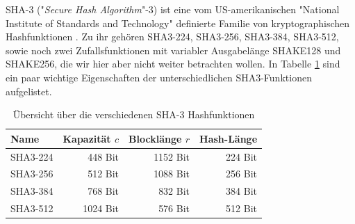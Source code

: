 SHA-3 ("\textit{Secure Hash Algorithm}"-3) ist eine vom US-amerikanischen "National Institute of Standards and Technology"
definierte Familie von kryptographischen Hashfunktionen \cite{sha3-standard}. Zu ihr gehören SHA3-224, SHA3-256, SHA3-384, SHA3-512,
sowie noch zwei Zufallsfunktionen mit variabler Ausgabelänge SHAKE128 und SHAKE256, die wir hier aber nicht weiter betrachten wollen.
In Tabelle \ref{tab:uebersicht_sha3} sind ein paar wichtige Eigenschaften der unterschiedlichen SHA3-Funktionen aufgelistet.\\

\begin{table}
	\centering
	\begin{tabular}{lrrr}
		Name & Kapazität $c$ & Blocklänge $r$ & Hash-Länge \\
		\hline
		SHA3-224 & 448 Bit & 1152 Bit & 224 Bit \\
		SHA3-256 & 512 Bit & 1088 Bit & 256 Bit \\
		SHA3-384 & 768 Bit & 832 Bit & 384 Bit \\
		SHA3-512 & 1024 Bit & 576 Bit & 512 Bit
	\end{tabular}
	\caption{Übersicht über die verschiedenen SHA-3 Hashfunktionen}
	\label{tab:uebersicht_sha3}
\end{table}

